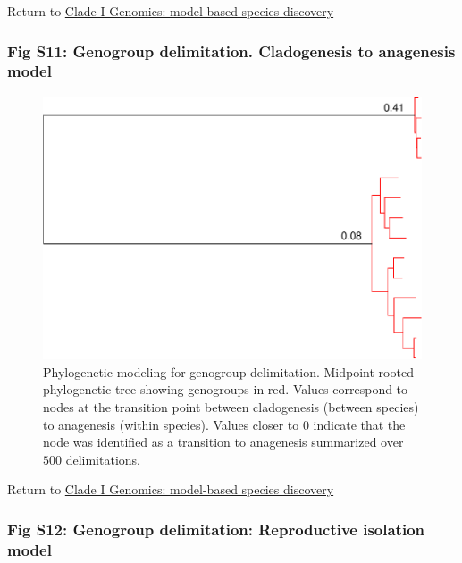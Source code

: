\documentclass[
  11pt,
]{article}
\begin{document}
Return to \protect\hyperlink{model-based-species-discovery-1}{Clade I Genomics: model-based species discovery}
\pagebreak

\hypertarget{fig-s11-genogroup-delimitation.-cladogenesis-to-anagenesis-model}{%
\subsubsection{Fig S11: Genogroup delimitation. Cladogenesis to anagenesis model}\label{fig-s11-genogroup-delimitation.-cladogenesis-to-anagenesis-model}}

\begin{figure}
\includegraphics[height=.6\textwidth,]{Supplementary_Material_files/figure-latex/cladeImolecularDelimitationsPhylogeny2-1} \caption{Phylogenetic modeling for genogroup delimitation. Midpoint-rooted phylogenetic tree showing genogroups in red. Values correspond to nodes at the transition point between cladogenesis (between species) to anagenesis (within species). Values closer to 0 indicate that the node was identified as a transition to anagenesis summarized over $500$ delimitations.}\label{fig:cladeImolecularDelimitationsPhylogeny2}
\end{figure}

Return to \protect\hyperlink{model-based-species-discovery-1}{Clade I Genomics: model-based species discovery}
\pagebreak

\hypertarget{fig-s12-genogroup-delimitation-reproductive-isolation-model}{%
\subsubsection{Fig S12: Genogroup delimitation: Reproductive isolation model}\label{fig-s12-genogroup-delimitation-reproductive-isolation-model}}
\end{document}

